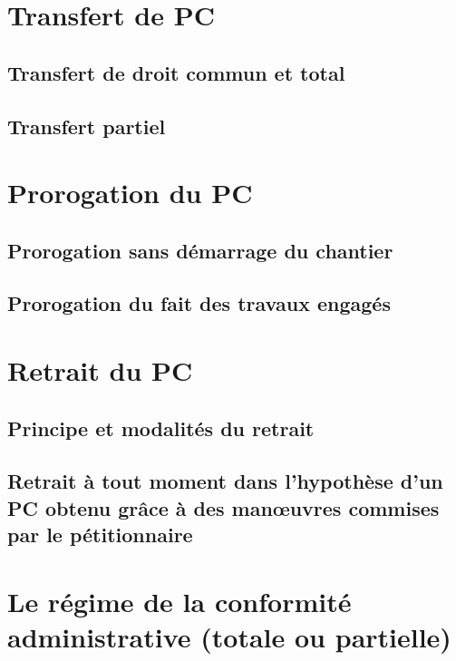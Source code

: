 \section{Transfert de PC}

	\subsection{Transfert de droit commun et total}
	
	\subsection{Transfert partiel}
	
\section{Prorogation du PC}
	
	\subsection{Prorogation sans démarrage du chantier}
	
	\subsection{Prorogation du fait des travaux engagés}
	
\section{Retrait du PC}
	
	\subsection{Principe et modalités du retrait}
	
	\subsection{Retrait à tout moment dans l'hypothèse d'un PC obtenu grâce à des manœuvres commises par le pétitionnaire}
	
\section{Le régime de la conformité administrative (totale ou partielle)}